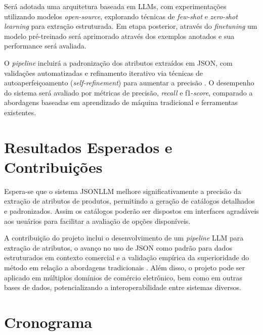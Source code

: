 Será adotada uma arquitetura baseada em LLMs, com experimentações utilizando modelos \textit{open-source}, explorando técnicas de \textit{few-shot} e \textit{zero-shot learning} para extração estruturada. Em etapa posterior, através do \textit{finetuning} um modelo pré-treinado será aprimorado através dos exemplos anotados e sua performance será avaliada.

O \textit{pipeline} incluirá a padronização dos atributos extraídos em JSON, com validações automatizadas e refinamento iterativo via técnicas de autoaperfeiçoamento (\textit{self-refinement}) para aumentar a precisão \citet{SelfRefinementLLM2024}. O desempenho do sistema será avaliado por métricas de precisão, \textit{recall} e f1-\textit{score}, comparado a abordagens baseadas em aprendizado de máquina tradicional e ferramentas existentes.

\section{Resultados Esperados e Contribuições} %

Espera-se que o sistema JSONLLM melhore significativamente a precisão da extração de atributos de produtos, permitindo a geração de catálogos detalhados e padronizados. Assim os catálogos poderão ser dispostos em interfaces agradáveis aos usuários para facilitar a avaliação de opções disponíveis.

A contribuição do projeto inclui o desenvolvimento de um \textit{pipeline} LLM para extração de atributos, o avanço no uso de JSON como padrão para dados estruturados em contexto comercial e a validação empírica da superioridade do método em relação a abordagens tradicionais \citet{ExtractGPT2023}. Além disso, o projeto pode ser aplicado em múltiplos domínios de comércio eletrônico, bem como em outras bases de dados, potencializando a interoperabilidade entre sistemas diversos.


\section{Cronograma} %

